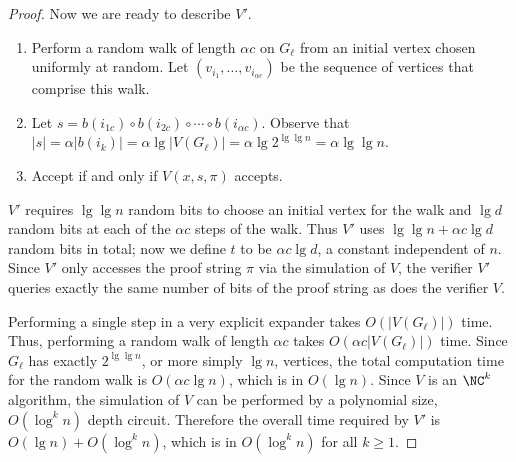 \documentclass{article}
\begin{document}
\begin{proof}
  Now we are ready to describe $V'$.
  \begin{enumerate}
  \item
    Perform a random walk of length $\alpha c$ on $G_\ell$ from an initial vertex chosen uniformly at random.
    Let $(v_{i_1}, \dotsc, v_{i_{\alpha c}})$ be the sequence of vertices that comprise this walk.
  \item
    Let $s = b(i_{1c}) \circ b(i_{2c}) \circ \dotsb \circ b(i_{\alpha c})$.
    Observe that $|s| = \alpha |b(i_k)| = \alpha \lg |V(G_\ell)| = \alpha \lg 2^{\lg \lg n} = \alpha \lg \lg n$.
  \item Accept if and only if $V(x, s, \pi)$ accepts.
  \end{enumerate}
  $V'$ requires $\lg \lg n$ random bits to choose an initial vertex for the walk and $\lg d$ random bits at each of the $\alpha c$ steps of the walk.
  Thus $V'$ uses $\lg \lg n + \alpha c \lg d$ random bits in total; now we define $t$ to be $\alpha c \lg d$, a constant independent of $n$.
  Since $V'$ only accesses the proof string $\pi$ via the simulation of $V$, the verifier $V'$ queries exactly the same number of bits of the proof string as does the verifier $V$.

  Performing a single step in a very explicit expander takes $O(|V(G_\ell)|)$ time.
  Thus, performing a random walk of length $\alpha c$ takes $O(\alpha c |V(G_\ell)|)$ time.
  Since $G_\ell$ has exactly $2^{\lg \lg n}$, or more simply $\lg n$, vertices, the total computation time for the random walk is $O(\alpha c \lg n)$, which is in $O(\lg n)$.
  Since $V$ is an $\NC^k$ algorithm, the simulation of $V$ can be performed by a polynomial size, $O(\log^k n)$ depth circuit.
  Therefore the overall time required by $V'$ is $O(\lg n) + O(\log^k n)$, which is in $O(\log^k n)$ for all $k \geq 1$.


\end{proof}
\end{document}
